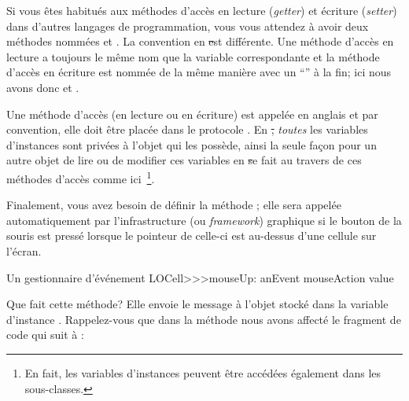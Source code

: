 \documentclass[a4paper,10pt,twoside]{book}
\begin{document}
Si vous êtes habitués aux méthodes d'accès en lecture (\emph{getter})
et écriture (\emph{setter}) dans d'autres langages de programmation,
vous vous attendez à avoir deux méthodes nommées 
et .
La convention en \st est différente.
Une méthode d'accès en lecture a toujours le même nom que la variable
correspondante et la méthode d'accès en écriture est nommée de la même
manière avec un ``\ct{:}'' à la fin; ici nous avons donc
 et .

Une méthode d'accès (en lecture ou en écriture) est appelée
en anglais  et par convention, elle doit être
placée dans le protocole .
En \st, \emph{toutes} les variables d'instances sont privées à
l'objet qui les possède, ainsi la seule façon pour un autre objet de
lire ou de modifier ces variables en \st se fait au travers de
ces méthodes d'accès comme ici~\footnote{En fait, les variables
  d'instances peuvent être accédées également dans les sous-classes.}.


Finalement, vous avez besoin de définir la méthode ; elle
sera appelée automatiquement par l'infrastructure (ou \emph{framework})
graphique si le bouton de la souris est pressé lorsque le pointeur de
celle-ci est au-dessus d'une cellule sur l'écran.

\begin{method}[sbecellmouseup]{Un gestionnaire d'événement}
LOCell>>>mouseUp: anEvent
   mouseAction value
\end{method}


Que fait cette méthode? Elle envoie le message  à l'objet
stocké dans la variable d'instance . 
Rappelez-vous que dans la méthode 
nous avons affecté le fragment de code qui suit à :
\end{document}
